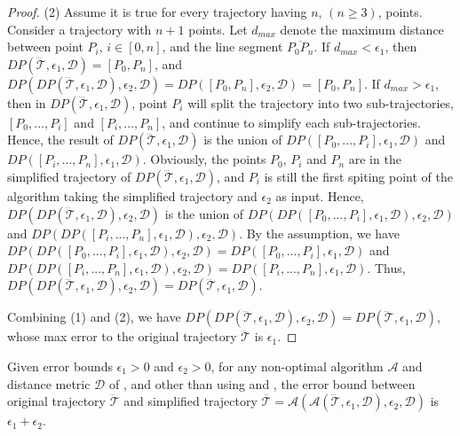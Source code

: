 \begin{proof}
	(2) Assume it is true for every trajectory  having $n$, $(n \ge 3)$, points.
	Consider a trajectory with $n+1$ points. Let $d_{max}$ denote the maximum distance between point $P_i$, $i \in [0,n]$, and the line segment $\overline{P_0P_{n}}$. 
	If $d_{max}<\epsilon_1$, then $DP(\dddot{\mathcal{T}}, \epsilon_1, \mathcal{D})=[P_0, P_{n}]$, and $DP(DP(\dddot{\mathcal{T}}, \epsilon_1, \mathcal{D}), \epsilon_2, \mathcal{D}) = DP([P_0, P_{n}], \epsilon_2, \mathcal{D})=[P_0, P_{n}]$.
	If $d_{max} > \epsilon_1$, then in $DP(\dddot{\mathcal{T}}, \epsilon_1, \mathcal{D})$, point $P_i$ will split the trajectory  into two sub-trajectories, \ie $[P_0, ..., P_i]$ and $[P_{i}, ..., P_{n}]$, and continue to simplify each sub-trajectories. Hence, the result of $DP(\dddot{\mathcal{T}}, \epsilon_1, \mathcal{D})$ is the union of $DP([P_0, ..., P_i], \epsilon_1, \mathcal{D})$ and $DP([P_i, ..., P_n], \epsilon_1, \mathcal{D})$.
	Obviously, the points $P_0$, $P_i$ and $P_n$ are in the simplified trajectory of $DP(\dddot{\mathcal{T}}, \epsilon_1, \mathcal{D})$, and $P_i$ is still the first spiting point of the \dpa algorithm taking the simplified trajectory and $\epsilon_2$ as input. Hence, $DP(DP(\dddot{\mathcal{T}}, \epsilon_1, \mathcal{D}), \epsilon_2, \mathcal{D})$ is the union of $DP(DP([P_0, ..., P_i], \epsilon_1, \mathcal{D}), \epsilon_2, \mathcal{D})$ and $DP(DP([P_i, ..., P_n], \epsilon_1, \mathcal{D}), \epsilon_2, \mathcal{D})$. By the assumption, we have $DP(DP([P_0, ..., P_i], \epsilon_1, \mathcal{D}), \epsilon_2, \mathcal{D}) = DP([P_0, ..., P_i], \epsilon_1, \mathcal{D})$ and $DP(DP([P_i, ..., P_n], \epsilon_1, \mathcal{D}), \epsilon_2, \mathcal{D}) = DP([P_i, ..., P_n], \epsilon_1, \mathcal{D})$. Thus, $DP(DP(\dddot{\mathcal{T}}, \epsilon_1, \mathcal{D}), \epsilon_2, \mathcal{D}) = DP(\dddot{\mathcal{T}}, \epsilon_1, \mathcal{D})$.
	
	Combining (1) and (2), we have $DP(DP(\dddot{\mathcal{T}}, \epsilon_1, \mathcal{D}), \epsilon_2, \mathcal{D}) = DP(\dddot{\mathcal{T}}, \epsilon_1, \mathcal{D})$, whose max error to the original trajectory $\dddot{\mathcal{T}}$ is $\epsilon_1$.
\end{proof}


\begin{theorem}
	\label{theo-aging-distance}
	Given error bounds $\epsilon_1>0$ and $\epsilon_2>0$, for any non-optimal \lsa algorithm $\mathcal{A}$ and distance metric $\mathcal{D}$ of \ped, \sed and \dad other than \dpa using \ped and \sed, the error bound between original trajectory $\dddot{\mathcal{T}}$ and simplified trajectory $\overline{\mathcal{T}}=\mathcal{A}(\mathcal{A}(\dddot{\mathcal{T}}, \epsilon_1, \mathcal{D}), \epsilon_2, \mathcal{D})$ is $\epsilon_1+ \epsilon_2$.
\end{theorem}

